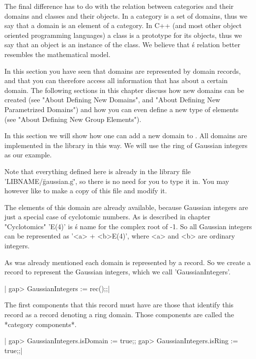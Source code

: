 The final difference  has  to do with the relation between categories and
their domains  and classes and  their objects.  In {\GAP} a category is a
set of domains, thus we  say that a domain is an element of  a  category.
In C++ (and most  other object oriented programming languages) a class is
a prototype for its objects, thus we say that an object is an instance of
the  class.   We  believe that  {\GAP}\'s  relation better resembles  the
mathematical model.

In this section you have  seen  that  domains  are represented by  domain
records, and that  you can therefore  access all information  that {\GAP}
has  about  a  certain  domain.  The  following  sections in this chapter
discuss how new domains can be created (see "About Defining New Domains",
and  "About Defining  New  Parametrized  Domains") and how you  can  even
define a new type of elements (see "About Defining New Group Elements").


In this section we will show how one can add a new domain to {\GAP}.  All
domains are implemented in the library in this way.  We will use the ring
of Gaussian integers as our example.

Note  that  everything  defined  here  is  already  in  the  library file
'LIBNAME/\"gaussian.g\"', so there is no need for you to type it in.  You
may however like to make a copy of this file and modify it.

The  elements of  this domain  are  already available,  because  Gaussian
integers are just a special case of cyclotomic numbers.  As  is described
in chapter "Cyclotomics" 'E(4)' is {\GAP}\'s name for the complex root of
-1.  So all Gaussian  integers can be  represented as  '<a> + <b>\*E(4)',
where <a> and <b> are ordinary integers.

As  was  already mentioned each domain is represented by a record.  So we
create  a  record  to  represent the Gaussian  integers,  which  we  call
'GaussianIntegers'.

|    gap> GaussianIntegers := rec();;|

The first components  that this record must have are those  that identify
this record as  a  record denoting a  ring domain.  Those components  are
called the *category components*.

|    gap> GaussianIntegers.isDomain := true;;
    gap> GaussianIntegers.isRing := true;;|

